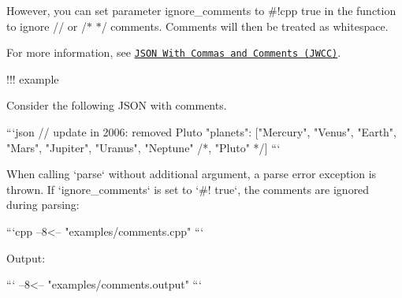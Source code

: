 However, you can set parameter {\ttfamily ignore\+\_\+comments} to {\ttfamily \#!cpp true} in the  function to ignore {\ttfamily /\+/\+} or {\ttfamily /\+\texorpdfstring{$\ast$}{*} \texorpdfstring{$\ast$}{*}/\+} comments. Comments will then be treated as whitespace.

For more information, see \href{https://nigeltao.github.io/blog/2021/json-with-commas-comments.html}{\texttt{JSON With Commas and Comments (JWCC)}}.

!!! example \begin{DoxyVerb}Consider the following JSON with comments.

```json
{
    // update in 2006: removed Pluto
    "planets": ["Mercury", "Venus", "Earth", "Mars",
                "Jupiter", "Uranus", "Neptune" /*, "Pluto" */]
}
```

When calling `parse` without additional argument, a parse error exception is thrown. If `ignore_comments` is set to `#! true`, the comments are ignored during parsing:

```cpp
--8<-- "examples/comments.cpp"
```

Output:

```
--8<-- "examples/comments.output"
```
\end{DoxyVerb}
 